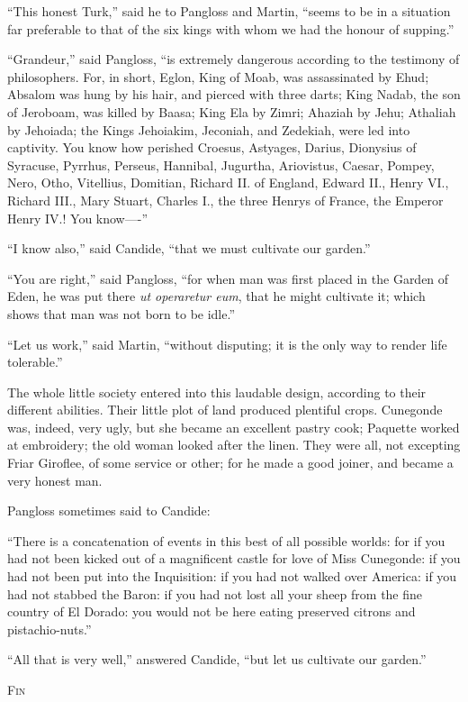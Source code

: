 ``This honest Turk,'' said he to Pangloss and Martin, ``seems to be in a situation far preferable to that of the six kings with whom we had the honour of supping.''

``Grandeur,'' said Pangloss, ``is extremely dangerous according to the testimony of philosophers. For, in short, Eglon, King of Moab, was assassinated by Ehud; Absalom was hung by his hair, and pierced with three darts; King Nadab, the son of Jeroboam, was killed by Baasa; King Ela by Zimri; Ahaziah by Jehu; Athaliah by Jehoiada; the Kings Jehoiakim, Jeconiah, and Zedekiah, were led into captivity. You know how perished Croesus, Astyages, Darius, Dionysius of Syracuse, Pyrrhus, Perseus, Hannibal, Jugurtha, Ariovistus, Caesar, Pompey, Nero, Otho, Vitellius, Domitian, Richard II. of England, Edward II., Henry VI., Richard III., Mary Stuart, Charles I., the three Henrys of France, the Emperor Henry IV.! You know----''

``I know also,'' said Candide, ``that we must cultivate our garden.''

``You are right,'' said Pangloss, ``for when man was first placed in the Garden of Eden, he was put there \textit{ut operaretur eum}, that he might cultivate it; which shows that man was not born to be idle.''

``Let us work,'' said Martin, ``without disputing; it is the only way to render life tolerable.''

The whole little society entered into this laudable design, according to their different abilities. Their little plot of land produced plentiful crops. Cunegonde was, indeed, very ugly, but she became an excellent pastry cook; Paquette worked at embroidery; the old woman looked after the linen. They were all, not excepting Friar Giroflee, of some service or other; for he made a good joiner, and became a very honest man.

Pangloss sometimes said to Candide:

``There is a concatenation of events in this best of all possible worlds: for if you had not been kicked out of a magnificent castle for love of Miss Cunegonde: if you had not been put into the Inquisition: if you had not walked over America: if you had not stabbed the Baron: if you had not lost all your sheep from the fine country of El Dorado: you would not be here eating preserved citrons and pistachio-nuts.''

``All that is very well,'' answered Candide, ``but let us cultivate our garden.''

\begin{center}
\textsc{Fin}	
\end{center}

